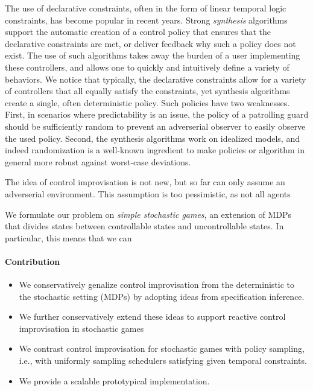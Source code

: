 The use of declarative constraints, often in the form of linear temporal logic constraints, has become popular in recent years. 
Strong \emph{synthesis} algorithms support the automatic creation of a control policy that ensures that the declarative constraints are met, or deliver feedback why such a policy does not exist. 
The use of such algorithms takes away the burden of a user implementing these controllers, and allows one to quickly and intuitively define a variety of behaviors.
We notice that typically, the declarative constraints allow for a variety of controllers that all equally satisfy the constraints, yet synthesis algorithms create a single, often deterministic policy. 
Such policies have two weaknesses. First, in scenarios where predictability is an issue, the policy of a patrolling guard should be sufficiently random to prevent an adverserial observer to easily observe the used policy. 
Second, the synthesis algorithms work on idealized models, and indeed  randomization is a well-known ingredient to make policies or algorithm in general more robust against worst-case deviations. 


The idea of control improvisation is not new, but so far can only assume an adverserial environment. This assumption is too pessimistic, as not all agents 

We formulate our problem on \emph{simple stochastic games}, an extension of MDPs that divides states between controllable states and uncontrollable states. 
In particular, this means that we can 



\paragraph{Contribution}

\begin{itemize}

\item We conservatively genalize control improvisation from the deterministic to the stochastic setting (MDPs) by adopting ideas from specification inference.
\item We further conservatively extend these ideas to support reactive control improvisation in stochastic games
\item We contrast control improvisation for stochastic games with policy sampling, i.e., with uniformly sampling schedulers satisfying given temporal constraints.
\item We provide a scalable prototypical implementation.
\end{itemize}


